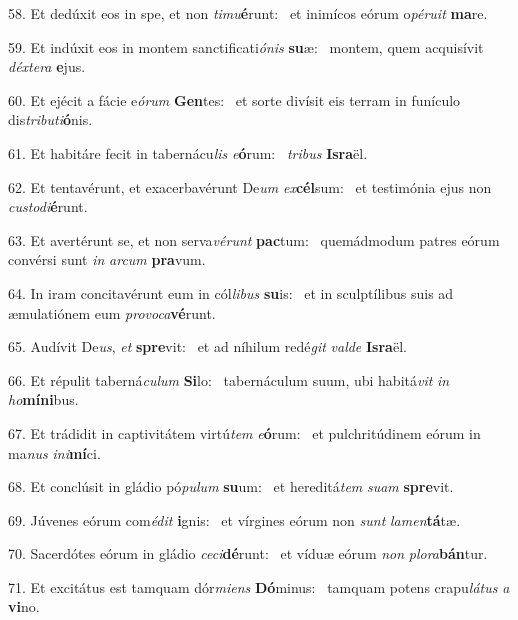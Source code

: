 58. Et dedúxit eos in spe, et non \textit{ti}\textit{mu}\textbf{é}runt: \ast\  et inimícos eórum o\textit{pé}\textit{ru}\textit{it} \textbf{ma}re.\

59. Et indúxit eos in montem sanctificati\textit{ó}\textit{nis} \textbf{su}æ: \ast\  montem, quem acquisívit \textit{déx}\textit{te}\textit{ra} \textbf{e}jus.\

60. Et ejécit a fácie e\textit{ó}\textit{rum} \textbf{Gen}tes: \ast\  et sorte divísit eis terram in funículo dis\textit{tri}\textit{bu}\textit{ti}\textbf{ó}nis.\

61. Et habitáre fecit in tabernácu\textit{lis} \textit{e}\textbf{ó}rum: \ast\  \textit{tri}\textit{bus} \textbf{Is}\textbf{ra}ël.\

62. Et tentavérunt, et exacerbavérunt De\textit{um} \textit{ex}\textbf{cél}sum: \ast\  et testimónia ejus non \textit{cus}\textit{to}\textit{di}\textbf{é}runt.\

63. Et avertérunt se, et non serva\textit{vé}\textit{runt} \textbf{pac}tum: \ast\  quemádmodum patres eórum convérsi sunt \textit{in} \textit{ar}\textit{cum} \textbf{pra}vum.\

64. In iram concitavérunt eum in cól\textit{li}\textit{bus} \textbf{su}is: \ast\  et in sculptílibus suis ad æmulatiónem eum \textit{pro}\textit{vo}\textit{ca}\textbf{vé}runt.\

65. Audívit De\textit{us}, \textit{et} \textbf{spre}vit: \ast\  et ad níhilum redé\textit{git} \textit{val}\textit{de} \textbf{Is}\textbf{ra}ël.\

66. Et répulit taberná\textit{cu}\textit{lum} \textbf{Si}lo: \ast\  tabernáculum suum, ubi habitá\textit{vit} \textit{in} \textit{ho}\textbf{mí}\textbf{ni}bus.\

67. Et trádidit in captivitátem virtú\textit{tem} \textit{e}\textbf{ó}rum: \ast\  et pulchritúdinem eórum in ma\textit{nus} \textit{in}\textit{i}\textbf{mí}ci.\

68. Et conclúsit in gládio pó\textit{pu}\textit{lum} \textbf{su}um: \ast\  et hereditá\textit{tem} \textit{su}\textit{am} \textbf{spre}vit.\

69. Júvenes eórum com\textit{é}\textit{dit} \textbf{i}gnis: \ast\  et vírgines eórum non \textit{sunt} \textit{la}\textit{men}\textbf{tá}tæ.\

70. Sacerdótes eórum in gládio \textit{ce}\textit{ci}\textbf{dé}runt: \ast\  et víduæ eórum \textit{non} \textit{plo}\textit{ra}\textbf{bán}tur.\

71. Et excitátus est tamquam dór\textit{mi}\textit{ens} \textbf{Dó}minus: \ast\  tamquam potens crapu\textit{lá}\textit{tus} \textit{a} \textbf{vi}no.\

